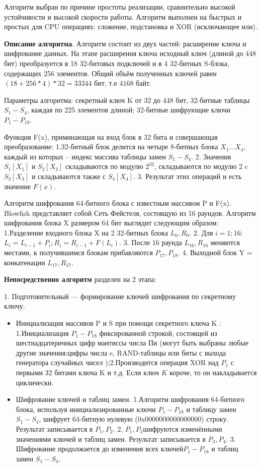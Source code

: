 Алгоритм выбран по причине простоты реализации, сравнительно высокой устойчивости и высокой скорости работы. Алгоритм выполнен на быстрых и простых для CPU операциях: сложение, подстановка и XOR (исключающее или).

\textbf{Описание алгоритма}. Алгоритм состоит из двух частей: расширение ключа и шифрование данных. На этапе расширения ключа исходный ключ (длиной до 448 бит) преобразуется в 18 32-битовых подключей и в 4 32-битных S-блока, содержащих 256 элементов. Общий объём полученных ключей равен $ ( 18 + 256 * 4 ) * 32 = 33344   $ бит, т.е  $ 4168 $ байт.

Параметры алгоритма: секретный ключ K от 32 до 448 бит, 32-битные  таблицы $ S_{1} - S_{4}$, каждая по 225 элементов длиной; 32-битные шифрующие ключи $ P_{1}-P_{18} $.

Функция F(x), приминающая на вход блок в 32 бита и совершающая преобразование: 1.32-битный блок делится на четыре 8-битных блока $ X_{1}...X_{4} $, каждый из которых -- индекс массива таблицы замен $ S_{1} - S_{4}$. 2. Значения $ S_{1}[X_{1}] $ и $ S_{2}[X_{2}] $ складываются по модулю $ 2^{32} $, складываются по модулю 2 c $ S_{3}[X_{3}] $ и складываются также с $ S_{4}[X_{4}] $. 3. Результат этих операций  и есть значение $ F(x) $.


Алгоритм шифрования 64-битного блока с известным массивом P и F(x). Blowfish представляет собой Сеть Фейстеля, состоящую из 16 раундов. Алгоритм шифрования блока  X размером 64 бит выглядит следующим образом: 1.Разделение входного блока  X на 2 32-битных блока $ L_{0}, R_{0} $. 2. Для $ i=1;16 $: $ L_{i}=L_{i-1}+P_{i}; R_{i}= R_{i-1}+F(L_{i}) $. 3. После 16 раунда $ L_{16},R_{16} $ меняются местами, к получившимся блокам прибавляются $ P_{17}, P_{18} $. 4. Выходной блок Y = конкатенации $ L_{17},R_{17} $.

\textbf{Непосредственно алгоритм} разделен на 2 этапа:

1. Подготовительный — формирование ключей шифрования по секретному ключу. 
\begin{itemize}
	\item Инициализация массивов P и S при помощи секретного ключа K : 1.Инициализация $ P_{1} - P_{18} $ фиксированной строкой, состоящей из шестнадцатеричных цифр мантиссы числа Пи (могут быть выбраны любые другие значения:цифры числа e, RAND-таблицы или биты с выхода генератора случайных чисел );2.Производится операция XOR над $ P_{1} $ с первыми 32 битами ключа K и т.д. Если ключ $ K $ короче, то он накладывается циклически.
	\item Шифрование ключей и таблиц замен.  1.Алгоритм шифрования 64-битного блока, используя инициализированные ключи $ P_{1} - P_{18} $ и таблицу замен $ S_{1} - S_{4}$, шифрует 64-битную нулевую (0x0000000000000000) строку. Результат записывается в $ P_{1}, P_{2} $. 2. $ P_{1}, P_{2} $шифруются изменёнными значениями ключей и таблиц замен. Результат записывается в $ P_{3}, P_{4} $. 3. Шифрование продолжается до изменения всех ключей$ P_{1} - P_{18} $ и таблиц замен  $ S_{1} - S_{4}$.
\end{itemize}


